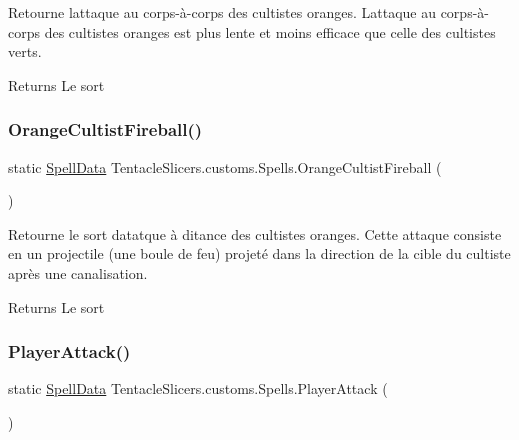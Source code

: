 Retourne l\textquotesingle{}attaque au corps-\/à-\/corps des cultistes oranges. L\textquotesingle{}attaque au corps-\/à-\/corps des cultistes oranges est plus lente et moins efficace que celle des cultistes verts. 

\begin{DoxyReturn}{Returns}
Le sort 
\end{DoxyReturn}
\mbox{\label{class_tentacle_slicers_1_1customs_1_1_spells_a423a02f284ad48266b68b8952a5f9f6a}} 
\subsubsection{\texorpdfstring{Orange\+Cultist\+Fireball()}{OrangeCultistFireball()}}
{\footnotesize\ttfamily static \hyperlink{class_tentacle_slicers_1_1spells_1_1_spell_data}{Spell\+Data} Tentacle\+Slicers.\+customs.\+Spells.\+Orange\+Cultist\+Fireball (\begin{DoxyParamCaption}{ }\end{DoxyParamCaption})\hspace{0.3cm}{\ttfamily [static]}}



Retourne le sort d\textquotesingle{}atatque à ditance des cultistes oranges. Cette attaque consiste en un projectile (une boule de feu) projeté dans la direction de la cible du cultiste après une canalisation. 

\begin{DoxyReturn}{Returns}
Le sort 
\end{DoxyReturn}
\mbox{\label{class_tentacle_slicers_1_1customs_1_1_spells_a1400f7def2ffb9f09f8c171bea304af2}} 
\subsubsection{\texorpdfstring{Player\+Attack()}{PlayerAttack()}}
{\footnotesize\ttfamily static \hyperlink{class_tentacle_slicers_1_1spells_1_1_spell_data}{Spell\+Data} Tentacle\+Slicers.\+customs.\+Spells.\+Player\+Attack (\begin{DoxyParamCaption}{ }\end{DoxyParamCaption})\hspace{0.3cm}{\ttfamily [static]}}




